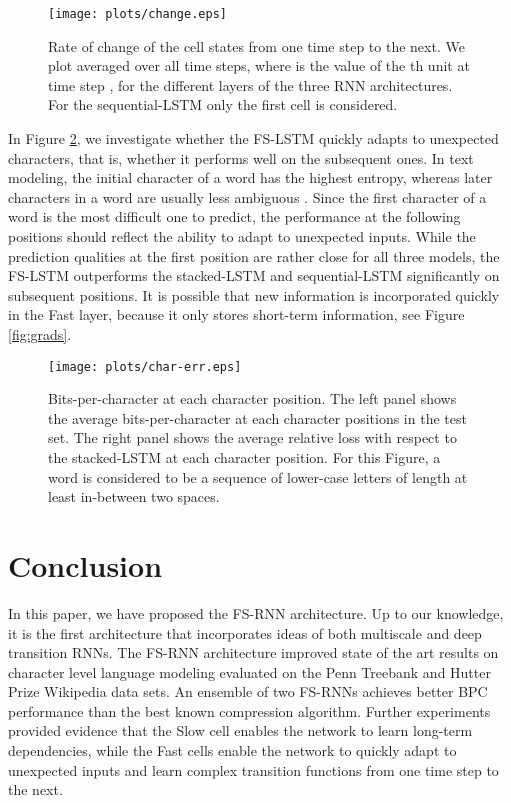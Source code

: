 \documentclass{article}
\begin{document}
\begin{figure}
    \centering
    \texttt{[image: plots/change.eps]}
    \caption{Rate of change of the cell states from one time step to the next. We plot
     averaged over all time steps, where  is the value of the th unit at time step ,  for the different layers of the three RNN architectures. For the sequential-LSTM only the first cell is considered. }
    \label{fig:change}
\end{figure}

In Figure \ref{fig:errors}, we investigate whether the FS-LSTM quickly adapts to unexpected characters, that is, whether it performs well on the subsequent ones.  In text modeling, the initial character of a word has the highest entropy, whereas later characters in a word are usually less ambiguous \cite{elman90entropy}. Since the first character of a word is the most difficult one to predict, the performance at the following positions should reflect the ability  to adapt to unexpected inputs.  While the prediction qualities at the first position are rather close for all three models, the FS-LSTM  outperforms the stacked-LSTM and sequential-LSTM significantly on subsequent positions. 
It is possible that new information is incorporated quickly in the Fast layer, because it only stores short-term information, see Figure \ref{fig:grads}.















\begin{figure}
    \centering
    \texttt{[image: plots/char-err.eps]}
    \caption{Bits-per-character at each character position. The left panel  shows the average bits-per-character at each character positions in the test set. The right panel shows the average relative loss with respect to the stacked-LSTM at each character position. For this Figure,  a word is considered to be a sequence of lower-case letters of length at least  in-between two spaces. }
    \label{fig:errors}
\end{figure}


 
\section{Conclusion} \label{sec:Conclusions}
In this paper, we have proposed the FS-RNN architecture. Up to our knowledge, it is the first architecture that incorporates ideas of both multiscale and deep transition RNNs. The FS-RNN architecture improved state of the art results on character level language modeling  evaluated  on the  Penn Treebank and Hutter Prize Wikipedia data sets. An ensemble of two FS-RNNs achieves better BPC performance than the best known compression algorithm. Further experiments provided evidence that the Slow  cell enables the network to learn long-term dependencies, while the Fast cells enable the network to quickly adapt to unexpected inputs and learn complex transition functions from one time step to the next. 
\end{document}
